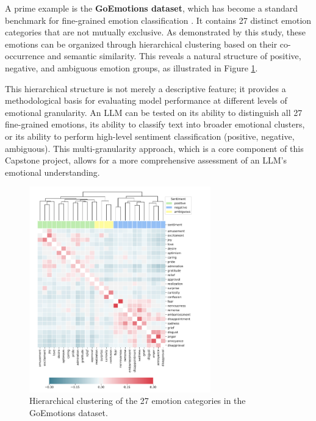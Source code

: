 A prime example is the \textbf{GoEmotions dataset}, which has become a standard benchmark for fine-grained emotion classification \cite{demszky2020goemotions}. It contains 27 distinct emotion categories that are not mutually exclusive. As demonstrated by this study, these emotions can be organized through hierarchical clustering based on their co-occurrence and semantic similarity. This reveals a natural structure of positive, negative, and ambiguous emotion groups, as illustrated in Figure \ref{fig:goemotions_cluster}.

This hierarchical structure is not merely a descriptive feature; it provides a methodological basis for evaluating model performance at different levels of emotional granularity. An LLM can be tested on its ability to distinguish all 27 fine-grained emotions, its ability to classify text into broader emotional clusters, or its ability to perform high-level sentiment classification (positive, negative, ambiguous). This multi-granularity approach, which is a core component of this Capstone project, allows for a more comprehensive assessment of an LLM's emotional understanding.

\begin{figure}[H]
    \centering
    \includegraphics[width=0.7\textwidth]{Images/emotion-taxonomy.PNG}
    \caption[Hierarchical Clustering of GoEmotions Dataset]{Hierarchical clustering of the 27 emotion categories in the GoEmotions dataset\cite{demszky2020goemotions}.}
    \label{fig:goemotions_cluster}
\end{figure}

